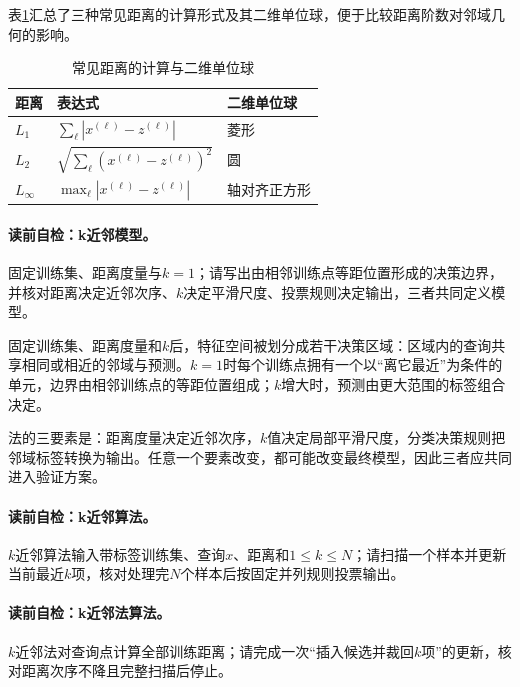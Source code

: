 表\ref{tab:V2-C02-distances}汇总了三种常见距离的计算形式及其二维单位球，便于比较距离阶数对邻域几何的影响。

\begin{table}[htbp]
\centering
\caption{常见距离的计算与二维单位球}\label{tab:V2-C02-distances}
\begin{tabular}{@{}lll@{}}
\toprule 距离 & 表达式 & 二维单位球\\ \midrule
$L_1$ & $\sum_\ell|x^{(\ell)}-z^{(\ell)}|$ & 菱形\\
$L_2$ & $\sqrt{\sum_\ell(x^{(\ell)}-z^{(\ell)})^2}$ & 圆\\
$L_\infty$ & $\max_\ell|x^{(\ell)}-z^{(\ell)}|$ & 轴对齐正方形\\
\bottomrule
\end{tabular}
\end{table}


\paragraph{读前自检：k近邻模型。}固定训练集、距离度量与$k=1$；请写出由相邻训练点等距位置形成的决策边界，并核对距离决定近邻次序、$k$决定平滑尺度、投票规则决定输出，三者共同定义\kNN{}模型。\par

\label{struct:V2-C02-CH08}
固定训练集、距离度量和$k$后，特征空间被划分成若干决策区域：区域内的查询共享相同或相近的邻域与预测。$k=1$时每个训练点拥有一个以“离它最近”为条件的单元，边界由相邻训练点的等距位置组成；$k$增大时，预测由更大范围的标签组合决定。

\kNN{}法的三要素是：距离度量决定近邻次序，$k$值决定局部平滑尺度，分类决策规则把邻域标签转换为输出。任意一个要素改变，都可能改变最终模型，因此三者应共同进入验证方案。

\paragraph{读前自检：k近邻算法。}$k$近邻算法输入带标签训练集、查询$x$、距离和$1\le k\le N$；请扫描一个样本并更新当前最近$k$项，核对处理完$N$个样本后按固定并列规则投票输出。\par
\paragraph{读前自检：k近邻法算法。}$k$近邻法对查询点计算全部训练距离；请完成一次“插入候选并裁回$k$项”的更新，核对距离次序不降且完整扫描后停止。\par

